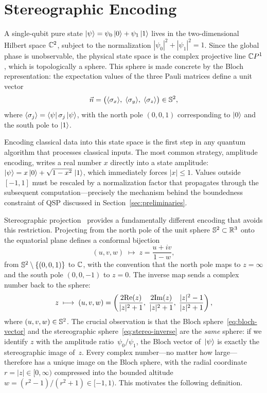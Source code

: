 \section{Stereographic Encoding}
\label{sec:encoding}

A single-qubit pure state
$\ket{\psi} = \psi_0\ket{0} + \psi_1\ket{1}$ lives in the
two-dimensional Hilbert space $\mathbb{C}^2$, subject to the normalization
$|\psi_0|^2 + |\psi_1|^2 = 1$.  Since the global phase is
unobservable, the physical state space is the complex projective
line $\mathbb{C} P^1$, which is topologically a sphere.  This sphere is
made concrete by the Bloch representation: the expectation values
of the three Pauli matrices define a unit vector
\begin{equation}
	\vec{n} = \big(\langle\sigma_x\rangle,\;
	\langle\sigma_y\rangle,\;
	\langle\sigma_z\rangle\big) \in \mathbb{S}^2,
	\label{eq:bloch-vector}
\end{equation}
where $\langle\sigma_j\rangle = \bra{\psi}\sigma_j\ket{\psi}$,
with the north pole $(0,0,1)$ corresponding to $\ket{0}$ and the
south pole to $\ket{1}$.

Encoding classical data into this state space is the first step in
any quantum algorithm that processes classical inputs.  The most
common strategy, amplitude encoding, writes a real number $x$
directly into a state amplitude:
$\ket{\psi} = x\ket{0} + \sqrt{1-x^2}\,\ket{1}$, which
immediately forces $|x| \leq 1$.  Values outside $[-1,1]$ must be
rescaled by a normalization factor that propagates through the
subsequent computation---precisely the mechanism behind the
boundedness constraint of QSP discussed in
Section~\ref{sec:preliminaries}.

Stereographic projection~\cite{DubrovinFomenkoNovikov1992}
provides a fundamentally different encoding that avoids this
restriction.  Projecting from the north pole of the unit sphere
$\mathbb{S}^2 \subset \mathbb{R}^3$ onto the equatorial plane defines a
conformal bijection
\begin{equation}
	(u, v, w) \;\longmapsto\; z = \frac{u + iv}{1 - w},
	\label{eq:stereo-forward}
\end{equation}
from $\mathbb{S}^2 \setminus \{(0,0,1)\}$ to $\mathbb{C}$, with the
convention that the north pole maps to $z = \infty$ and the
south pole $(0,0,-1)$ to $z = 0$.  The inverse map sends a
complex number back to the sphere:
\begin{equation}
	z \;\longmapsto\; (u, v, w) = \left(\frac{2\mathrm{Re}(z)}{|z|^2 + 1},\;
	\frac{2\mathrm{Im}(z)}{|z|^2 + 1},\;
	\frac{|z|^2 - 1}{|z|^2 + 1}\right),
	\label{eq:stereo-inverse}
\end{equation}
where $(u,v,w) \in \mathbb{S}^2$.  The crucial observation is that the Bloch
sphere~\eqref{eq:bloch-vector} and the stereographic
sphere~\eqref{eq:stereo-inverse} are the \emph{same} sphere: if
we identify $z$ with the amplitude ratio~$\psi_0/\psi_1$, the
Bloch vector of~$\ket{\psi}$ is exactly the stereographic image
of~$z$.  Every complex number---no matter how large---therefore
has a unique image on the Bloch sphere, with the radial coordinate
$r = |z| \in [0,\infty)$ compressed into the bounded altitude
$w = (r^2 - 1)/(r^2 + 1) \in [-1,1)$.  This motivates the
following definition.


